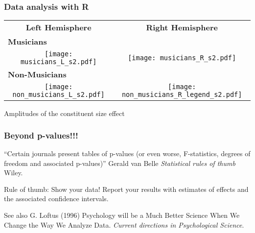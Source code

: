 \documentclass{beamer}
\begin{document}

\begin{frame}
\frametitle{Data analysis with R}

\centering
\begin{tabular}{cc}
\textbf{\textsf{Left Hemisphere}} & \textbf{\textsf{Right Hemisphere}} \\
\multicolumn{2}{l}{\textbf{\textsf{Musicians}}} \\

\quad \texttt{[image: musicians\_L\_s2.pdf]}  &
\texttt{[image: musicians\_R\_s2.pdf]} \\
	
\multicolumn{2}{l}{\textbf{\textsf{Non-Musicians}}} \\

\quad \texttt{[image: non\_musicians\_L\_s2.pdf]}  &
\texttt{[image: non\_musicians\_R\_legend\_s2.pdf]} \\
									
\end{tabular}

{\footnotesize Amplitudes of the constituent size effect}

\end{frame}


\begin{frame}
\frametitle{Beyond p-values!!!}

``Certain journals present tables of p-values (or even worse, F-statistics, degrees of freedom and associated p-values)'' Gerald van Belle \emph{Statistical rules of thumb} Wiley.

Rule of thumb: Show your data! Report your results with estimates of effects and the associated confidence intervals.


\vspace*{2cm}

See also G. Loftus (1996) Psychology will be a Much Better Science
When We Change the Way We Analyze Data. \emph{Current directions in Psychological Science}.

\end{frame}
\end{document}
